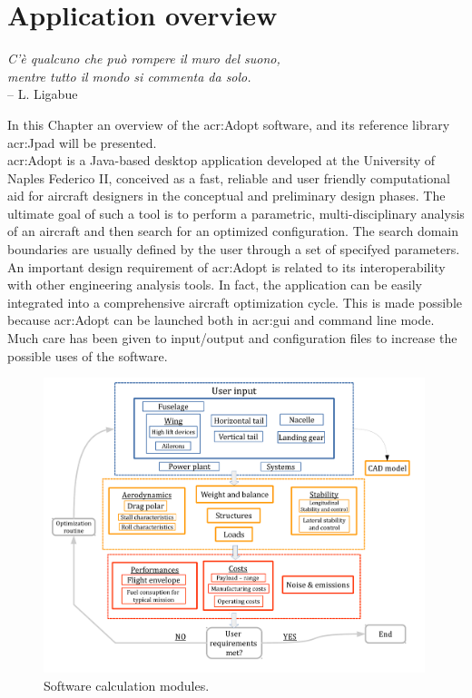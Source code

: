 \chapter{Application overview}
\label{ch:applicationoverview}

\begin{flushright}
	{\smaller
		\textit{C'è qualcuno che può rompere il muro del suono,\\ mentre tutto il mondo si commenta da solo.}\\
		-- L. Ligabue}
\end{flushright}

In this Chapter an overview of the \gls{acr:Adopt} software, and its reference library \gls{acr:Jpad} will be presented.\\
\gls{acr:Adopt} is a Java-based desktop application developed at the University of Naples Federico II, conceived as a fast, reliable and user friendly computational aid for aircraft designers in the conceptual and preliminary design phases. The ultimate goal of such a tool is to perform a parametric, multi-disciplinary analysis of an aircraft and then search for an optimized configuration. The search domain boundaries are usually defined by the user through a set of specifyed parameters. An important design requirement of  \gls{acr:Adopt} is related to its interoperability with other engineering analysis tools. In fact, the application can be easily integrated into a comprehensive aircraft optimization cycle. This is made possible because  \gls{acr:Adopt} can be launched both in \gls{acr:gui} and command line mode. Much care has been given to input/output and configuration files to increase the possible uses of the software.

\begin{figure}[H]
	\centering
	\includegraphics[height = 8.6cm ]{Immagini/flowchart3}
	\caption{Software calculation modules.}
	\label{fig:guiStart}
\end{figure}

